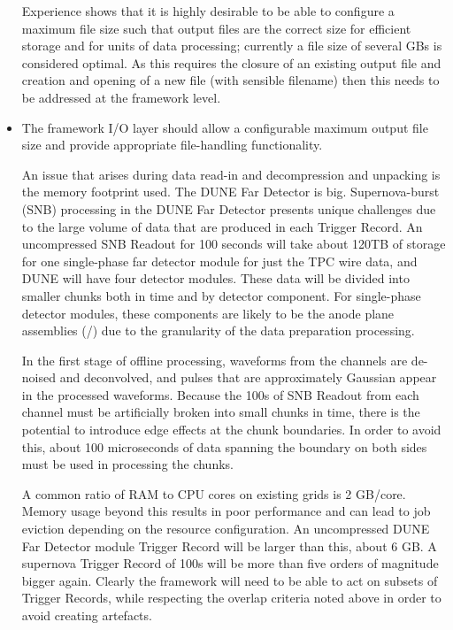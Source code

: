 \documentclass[../main-v1.tex]{subfiles}
\begin{document}
\begin{itemize}
Experience shows that it is highly desirable to be able to configure a maximum file size such that output files are the correct size for efficient storage and for units of data processing; currently a file size of several GBs is considered optimal.  As this requires the closure of an existing output file and creation and opening of a new file (with sensible filename) then this needs to be addressed at the framework level.

\item The framework I/O layer should allow a configurable maximum output file size and provide appropriate file-handling functionality.




An issue that arises during data read-in and decompression and unpacking is the memory footprint used.  The DUNE Far Detector is big.  Supernova-burst (SNB) processing in the DUNE Far Detector presents unique challenges due to the large volume of data that are produced in each Trigger Record.  An uncompressed SNB Readout for 100 seconds will take about 120TB of storage for one single-phase far detector module for just the TPC wire data, and DUNE will have four detector modules.  These data will be divided into smaller chunks both in time and by detector component.  For single-phase detector modules, these components are likely to be the anode plane assemblies (/) due to the granularity of the data preparation processing.

In the first stage of offline processing, waveforms from the channels are de-noised and deconvolved, and pulses that are approximately Gaussian appear in the processed waveforms. Because the 100s of SNB Readout from each channel must be artificially broken into small chunks in time, there is the potential to introduce edge effects at the chunk boundaries. In order to avoid this, about 100 microseconds of data spanning the boundary on both sides must be used in processing the chunks.

A common ratio of RAM to CPU cores on existing grids is 2 GB/core.  Memory usage beyond this results in poor performance and can lead to job eviction depending on the resource configuration.  An uncompressed DUNE Far Detector module Trigger Record will be larger than this, about 6 GB.  A supernova Trigger Record of 100s will be more than five orders of magnitude bigger again.  Clearly the framework will need to be able to act on subsets of Trigger Records, while respecting the overlap criteria noted above in order to avoid creating artefacts.


\end{itemize}
\end{document}
